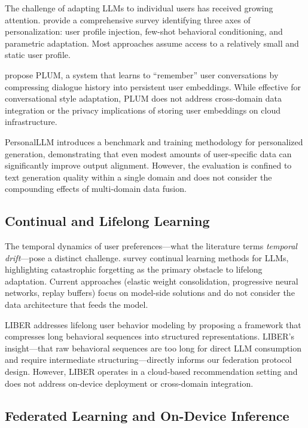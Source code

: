 \documentclass[11pt,a4paper]{article}
\begin{document}
The challenge of adapting LLMs to individual users has received growing
attention. \citet{survey_personalized_llm_2025} provide a comprehensive survey
identifying three axes of personalization: user profile injection, few-shot
behavioral conditioning, and parametric adaptation. Most approaches assume
access to a relatively small and static user profile.

\citet{plum2024} propose PLUM, a system that learns to ``remember'' user
conversations by compressing dialogue history into persistent user embeddings.
While effective for conversational style adaptation, PLUM does not address
cross-domain data integration or the privacy implications of storing user
embeddings on cloud infrastructure.

PersonalLLM \citep{personalllm2025} introduces a benchmark and training
methodology for personalized generation, demonstrating that even modest
amounts of user-specific data can significantly improve output alignment.
However, the evaluation is confined to text generation quality within a single
domain and does not consider the compounding effects of multi-domain data
fusion.

\subsection{Continual and Lifelong Learning}

The temporal dynamics of user preferences---what the literature terms
\emph{temporal drift}---pose a distinct challenge. \citet{continual_llm_survey_2024}
survey continual learning methods for LLMs, highlighting catastrophic
forgetting as the primary obstacle to lifelong adaptation. Current approaches
(elastic weight consolidation, progressive neural networks, replay buffers)
focus on model-side solutions and do not consider the data architecture that
feeds the model.

LIBER \citep{liber2024} addresses lifelong user behavior modeling by proposing
a framework that compresses long behavioral sequences into structured
representations. LIBER's insight---that raw behavioral sequences are too long
for direct LLM consumption and require intermediate structuring---directly
informs our federation protocol design. However, LIBER operates in a
cloud-based recommendation setting and does not address on-device deployment
or cross-domain integration.

\subsection{Federated Learning and On-Device Inference}
\end{document}
